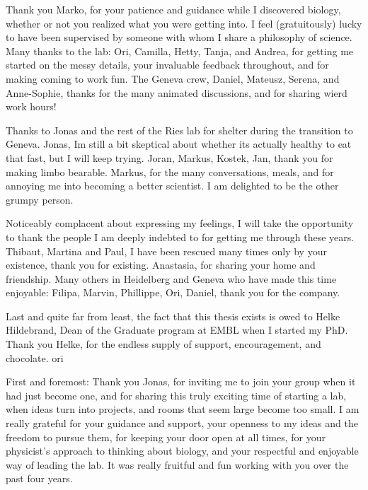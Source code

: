 \documentclass[
12pt, %
ngerman,
english, %
onehalfspacing,
hidelinks,
toctotoc, %
headsepline, %
]{MastersDoctoralThesis} %
\begin{document}
\begin{acknowledgements}

Thank you Marko, for your patience and guidance while I discovered biology, whether or not you realized what you were getting into. I feel (gratuitously) lucky to have been supervised by someone with whom I share a philosophy of science. Many thanks to the lab: Ori, Camilla, Hetty, Tanja, and Andrea, for getting me started on the messy details, your invaluable feedback throughout, and for making coming to work fun. The Geneva crew, Daniel, Mateusz, Serena, and Anne-Sophie, thanks for the many animated discussions, and for sharing wierd work hours! 

Thanks to Jonas and the rest of the Ries lab for shelter during the transition to Geneva. Jonas, Im still a bit skeptical about whether its actually healthy to eat that fast, but I will keep trying. Joran, Markus, Kostek, Jan, thank you for making limbo bearable. Markus, for the many conversations, meals, and for annoying me into becoming a better scientist. I am delighted to be the other grumpy person. 

Noticeably complacent about expressing my feelings, I will take the opportunity to thank the people I am deeply indebted to for getting me through these years. Thibaut, Martina and Paul, I have been rescued many times only by your existence, thank you for existing. Anastasia, for sharing your home and friendship. Many others in Heidelberg and Geneva who have made this time enjoyable: Filipa, Marvin, Phillippe, Ori, Daniel, thank you for the company.

Last and quite far from least, the fact that this thesis exists is owed to Helke Hildebrand, Dean of the Graduate program at EMBL when I started my PhD. Thank you Helke, for the endless supply of support, encouragement, and chocolate. 
ori


First and foremost: Thank you Jonas, for inviting me to join your group when it had just become one, and for sharing this truly exciting time of starting a lab, when ideas turn into projects, and rooms that seem large become too small. I am really grateful for your guidance and support, your openness to my ideas and the freedom to pursue them, for keeping your door open at all times, for your physicist's approach to thinking about biology, and your respectful and enjoyable way of leading the lab. It was really fruitful and fun working with you over the past four years. 



\vspace{\baselineskip}




\end{acknowledgements}
\end{document}
